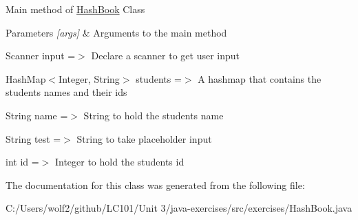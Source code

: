Main method of \mbox{\hyperlink{classexercises_1_1_hash_book}{Hash\+Book}} Class 
\begin{DoxyParams}{Parameters}
{\em \mbox{[}args\mbox{]}} & Arguments to the main method \\
\hline
\end{DoxyParams}
Scanner input =$>$ Declare a scanner to get user input

Hash\+Map$<$\+Integer, String$>$ students =$>$ A hashmap that contains the student\textquotesingle{}s names and their ids

String name =$>$ String to hold the student\textquotesingle{}s name

String test =$>$ String to take placeholder input

int id =$>$ Integer to hold the student\textquotesingle{}s id 

The documentation for this class was generated from the following file\+:\begin{DoxyCompactItemize}
\item 
C\+:/\+Users/wolf2/github/\+L\+C101/\+Unit 3/java-\/exercises/src/exercises/Hash\+Book.\+java\end{DoxyCompactItemize}
